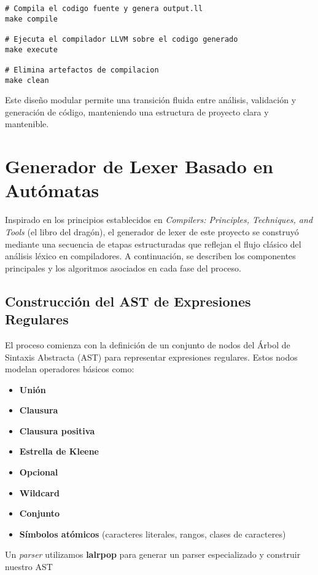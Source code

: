 \documentclass{article}
\begin{document}
\begin{lstlisting}
# Compila el codigo fuente y genera output.ll
make compile

# Ejecuta el compilador LLVM sobre el codigo generado
make execute

# Elimina artefactos de compilacion
make clean
\end{lstlisting}

Este diseño modular permite una transición fluida entre análisis, validación y generación de código, manteniendo una estructura de proyecto clara y mantenible.

\section{Generador de Lexer Basado en Autómatas}

Inspirado en los principios establecidos en \textit{Compilers: Principles, Techniques, and Tools} (el libro del dragón), el generador de lexer de este proyecto se construyó mediante una secuencia de etapas estructuradas que reflejan el flujo clásico del análisis léxico en compiladores. A continuación, se describen los componentes principales y los algoritmos asociados en cada fase del proceso.

\subsection{Construcción del AST de Expresiones Regulares}

El proceso comienza con la definición de un conjunto de nodos del Árbol de Sintaxis Abstracta (AST) para representar expresiones regulares. Estos nodos modelan operadores básicos como:
\begin{itemize}
    \item \textbf{Unión}
    \item \textbf{Clausura}
    \item \textbf{Clausura positiva}
    \item \textbf{Estrella de Kleene}
    \item \textbf{Opcional}
    \item \textbf{Wildcard}
    \item \textbf{Conjunto}
    \item \textbf{Símbolos atómicos} (caracteres literales, rangos, clases de caracteres)
\end{itemize}

Un \textit{parser} utilizamos \textbf{lalrpop} para generar un parser especializado y construir nuestro AST
\end{document}

